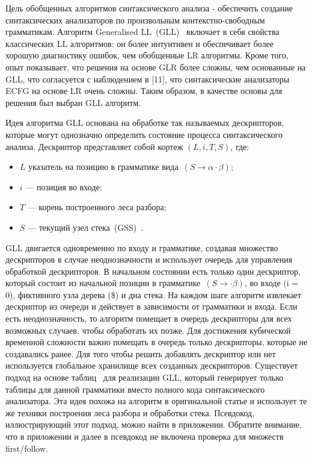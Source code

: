 \documentclass[14pt]{matmex-diploma-custom}
\begin{document}
	Цель обобщенных алгоритмов синтаксического анализа - обеспечить создание синтаксических
	анализаторов по произвольным контекстно-свободным грамматикам.
	Алгоритм Generalised LL~(GLL)~\cite{scott2010gll} включает в себя свойства классических LL алгоритмов:
	он более интуитивен и обеспечивает более хорошую диагностику ошибок, 
	чем обобщенные LR алгоритмы. Кроме того, опыт показывает, что решения на основе
	GLR более сложны, чем основанные на GLL, что согласуется с наблюдением в [11], что
	синтаксические анализаторы ECFG на основе LR очень сложны. Таким образом, в качестве
	основы для решения был выбран GLL алгоритм. 
	
	Идея алгоритма GLL основана на обработке так называемых дескрипторов, которые 
	могут однозначно определить состояние процесса синтаксического анализа. Дескриптор
	представляет собой кортеж $(L, i, T, S)$, где:
	\begin{itemize}
		\item $L$ указатель на позицию в грамматике вида~$(S \to \alpha \cdot \beta)$;
		\item $i$ --- позиция во входе;
		\item $T$ --- корень построенного леса разбора;
		\item $S$ --- текущий узел стека~(GSS)~\cite{afroozeh2015faster}.
	\end{itemize}
	
	GLL двигается одновременно по входу и грамматике, создавая множество дескрипторов
	в случае неоднозначности и использует очередь для управления обработкой дескрипторов.
	В начальном состоянии есть только один дескриптор, который состоит из начальной 
	позиции в грамматике~$(S \to \cdot \beta)$, во входе (i = 0), фиктивного узла дерева (\$)
	и дна стека. На каждом шаге алгоритм извлекает дескриптор из очереди и действует
	в зависимости от грамматики и входа. Если есть неоднозначность, то алгоритм помещает
	в очередь дескрипторы для всех возможных случаев, чтобы обработать их позже. 
	Для достижения кубической временной сложности важно помещать в очередь только дескрипторы,
	которые не создавались ранее. Для того чтобы решить добавлять дескриптор или нет
	используется глобальное хранилище всех созданных дескрипторов.
	Существует подход на основе таблиц~\cite{ragozina} для реализации GLL, который генерирует
	только таблицы для данной грамматики вместо полного кода синтаксического анализатора.
	Эта идея похожа на алгоритм в оригинальной статье и использует те же техники
	построения леса разбора и обработки стека. Псевдокод, иллюстрирующий этот подход, 
	можно найти в приложении. Обратите внимание, что в приложении и далее в псевдокод не включена
	проверка для множеств first/follow.
    
\end{document}
